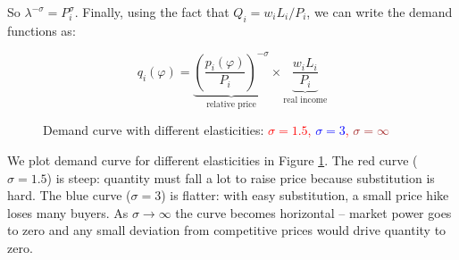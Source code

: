 \documentclass[11pt,letterpaper]{article}
\begin{document}
So $\lambda^{-\sigma} = P_i^{\sigma}$. Finally, using the fact that $Q_i = w_i L_i / P_i$, we can write the demand functions as:

\begin{equation*}
\boxed{
    q_i(\varphi) = \underbrace{\left( \frac{p_i(\varphi)}{P_i} \right)^{-\sigma}}_{\text{relative price}} \times \underbrace{\frac{w_iL_i}{P_i}}_{\text{real income}}}
\end{equation*}

    \begin{figure}[htp]
        \centering
            \caption{Demand curve with different elasticities: \textcolor{red}{$\sigma=1.5$, \textcolor{blue}{$\sigma=3$}, \textcolor{brown}{$\sigma=\infty$}}}
        \label{fig: ces-demand}
    \end{figure}

We plot demand curve for different elasticities in Figure \ref{fig: ces-demand}. The red curve ($\sigma=1.5$) is steep: quantity must fall a lot to raise price because substitution is hard. The blue curve ($\sigma=3$) is flatter: with easy substitution, a small price hike loses many buyers. As  $\sigma \to \infty$ the curve becomes horizontal -- market power goes to zero and  any small deviation from competitive prices would drive quantity to zero.
\end{document}
